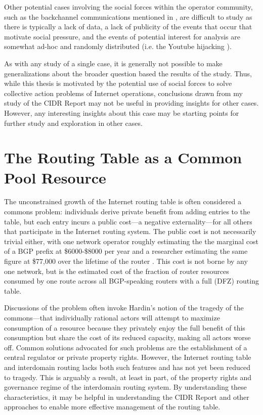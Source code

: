 Other potential cases involving the social forces within the operator community, such as the backchannel communications mentioned in \cite{Mathew:2010ly}, are difficult to study as there is typically a lack of data, a lack of publicity of the events that occur that motivate social pressure, and the events of potential interest for analysis are somewhat ad-hoc and randomly distributed (i.e. the Youtube hijacking \cite{Brown:2008hc}).

As with any study of a single case, it is generally not possible to make generalizations about the broader question based the results of the study. Thus, while this thesis is motivated by the potential use of social forces to solve collective action problems of Internet operations, conclusions drawn from my study of the CIDR Report may not be useful in providing insights for other cases. However, any interesting insights about this case may be starting points for further study and exploration in other cases.

\section{The Routing Table as a Common Pool Resource}

The unconstrained growth of the Internet routing table is often considered a commons problem: individuals derive private benefit from adding entries to the table, but each entry incurs a public cost---a negative externality---for all others that participate in the Internet routing system. The public cost is not necessarily trivial either, with one network operator roughly estimating the the marginal cost of a BGP prefix at \$6000-\$8000 per year \cite{Herrin:2008qa} and a researcher estimating the same figure at \$77,000 over the lifetime of the router \cite{Clayton:2010bh}. This cost is not borne by any one network, but is the estimated cost of the fraction of router resources consumed by one route across all BGP-speaking routers with a full (DFZ) routing table.

Discussions of the problem \cite{Huston:2001bs,Clayton:2010bh,Bellovin:2001qf} often invoke Hardin's \cite{Hardin:1968uq} notion of the tragedy of the commons---that individually rational actors will attempt to maximize consumption of a resource because they privately enjoy the full benefit of this consumption but share the cost of its reduced capacity, making all actors worse off. Common solutions advocated for such problems are the establishment of a central regulator or private property rights. However, the Internet routing table and interdomain routing lacks both such features and has not yet been reduced to tragedy. This is arguably a result, at least in part, of the property rights and governance regime of the interdomain routing system. By understanding these characteristics, it may be helpful in understanding the CIDR Report and other approaches to enable more effective management of the routing table.

